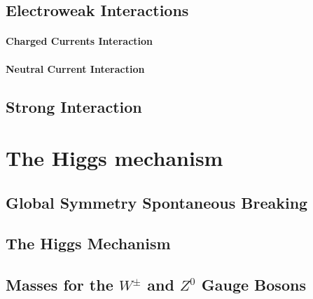 \documentclass[10pt,twoside,cucitura,classica,english,openany]{toptesi}
\begin{document}


\subsection{Electroweak Interactions}
\label{sec:electro-weak-inter}



\paragraph{Charged Currents Interaction}
\label{sec:charg-curr-inter}



\paragraph{Neutral Current Interaction}
\label{sec:neutr-curr-inter}



\subsection{Strong Interaction}
\label{sec:strong-int}



\section{The Higgs mechanism}
\label{sec:higgs-mechanism}



\subsection{Global Symmetry Spontaneous Breaking}
\label{sec:glob-symm-break}



\subsection{The Higgs Mechanism}
\label{sec:higgs-model}



\subsection{Masses for the $W^{\pm}$ and $Z^{0}$ Gauge Bosons}
\label{sec:masses-wpm-z}
\end{document}
